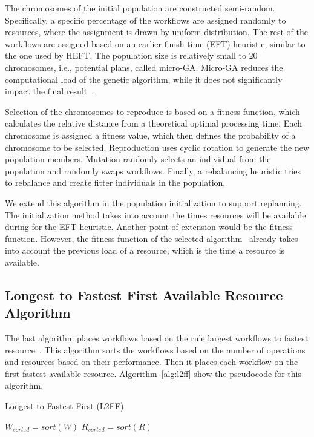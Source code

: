 The chromosomes of the initial population are constructed semi-random.
Specifically, a specific percentage of the workflows are assigned randomly to resources, where the assignment is drawn by uniform distribution.
The rest of the workflows are assigned based on an earlier finish time (EFT) heuristic, similar to the one used by HEFT.
The population size is relatively small to 20 chromosomes, i.e., potential plans, called micro-GA.
Micro-GA reduces the computational load of the genetic algorithm, while it does not significantly impact the final result~\cite{zomaya2001observations}.

Selection of the chromosomes to reproduce is based on a fitness function, which calculates the relative distance from a theoretical optimal processing time.
Each chromosome is assigned a fitness value, which then defines the probability of a chromosome to be selected.
Reproduction uses cyclic rotation to generate the new population members.
Mutation randomly selects an individual from the population and randomly swaps workflows.
Finally, a rebalancing heuristic tries to rebalance and create fitter individuals in the population.

We extend this algorithm in the population initialization to support replanning..
The initialization method takes into account the times resources will be available during for the EFT heuristic.
Another point of extension would be the fitness function.
However, the fitness function of the selected algorithm~\cite{page2005algorithm} already takes into account the previous load of a resource, which is the time a resource is available.

\subsection{Longest to Fastest First Available Resource Algorithm}
\label{algo:l2ff}
The last algorithm places workflows based on the rule largest workflows to fastest resource~\cite{balasubramanian2019programming}.
This algorithm sorts the workflows based on the number of operations and resources based on their performance.
Then it places each workflow on the first fastest available resource.
Algorithm~\ref{alg:l2ff} show the pseudocode for this algorithm.

\begin{algorithm}[ht]
    \caption{Longest to Fastest First (L2FF)}
    \label{alg:l2ff}
    \begin{algorithmic}[1]
        \State \texttt{$W_{sorted}=sort(W)$} 
        \State \texttt{$R_{sorted}=sort(R)$}
        \EndFor
        \EndProcedure
    \end{algorithmic}
\end{algorithm}

